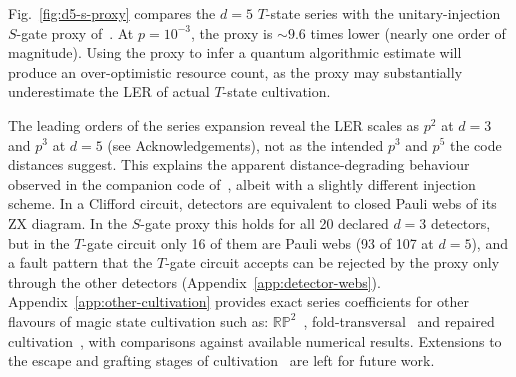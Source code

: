 Fig.~\ref{fig:d5-s-proxy} compares the $d=5$ $T$-state series with the
unitary-injection $S$-gate proxy of~\cite{msc}.
At $p=10^{-3}$, the proxy is $\sim 9.6$ times lower (nearly one order of
magnitude). 
Using the proxy to infer a quantum algorithmic estimate will produce an over-optimistic resource count, as the proxy may substantially underestimate the LER of actual $T$-state cultivation.

The leading orders of the series expansion reveal the LER scales as $p^{2}$ at $d=3$ and $p^{3}$ at $d=5$ (see Acknowledgements), not as the intended $p^{3}$ and $p^{5}$ the code distances suggest. 
This explains the apparent distance-degrading behaviour observed in the companion code of~\cite{wan}, albeit with a slightly different injection scheme. 
In a Clifford circuit, detectors are equivalent to closed Pauli webs of its ZX diagram. In the $S$-gate proxy this holds for all 20 declared $d=3$ detectors, but in the $T$-gate circuit only 16 of them are Pauli webs (93 of 107 at $d=5$), and a fault pattern that the $T$-gate circuit accepts can be rejected by the proxy only through the other detectors (Appendix~\ref{app:detector-webs}).
Appendix~\ref{app:other-cultivation} provides exact series coefficients for other flavours of magic state cultivation such as: $\mathbb{RP}^{2}$~\cite{RP2_prxq}, fold-transversal~\cite{fold_msc_prxq} and repaired cultivation~\cite{chan2026diagnosingrestoringdegradedfault}, with comparisons against available numerical results.
Extensions to the escape and grafting stages of cultivation~\cite{msc} are left for future work.
